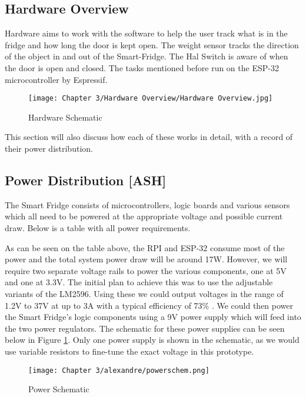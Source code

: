 \subsection{Hardware Overview}

Hardware aims to work with the software to help the user track what is in the fridge and how long the door is kept open.
The weight sensor tracks the direction of the object in and out of the Smart-Fridge.
The Hal Switch is aware of when the door is open and closed.
The tasks mentioned before run on the ESP-32 microcontroller by Espressif.


\begin{figure}[H]        
    \centering
    \texttt{[image: Chapter 3/Hardware Overview/Hardware Overview.jpg]}
    \caption{Hardware Schematic}
\end{figure} 

This section will also discuss how each of these works in detail, with a record of their power distribution.


\subsection{Power Distribution [ASH]}

The Smart Fridge consists of microcontrollers, logic boards and various sensors which all need to be powered at the appropriate voltage and possible current draw.
Below is a table with all power requirements.



As can be seen on the table above, the RPI and ESP-32 consume most of the power and the total system power draw will be around 17W.
However, we will require two separate voltage rails to power the various components, one at 5V and one at 3.3V.
The initial plan to achieve this was to use the adjustable variants of the LM2596.
Using these we could output voltages in the range of 1.2V to 37V at up to 3A with a typical efficiency of 73\% \cite{tidatasheet}.
We could then power the Smart Fridge's logic components using a 9V power supply which will feed into the two power regulators.
The schematic for these power supplies can be seen below in Figure \ref{fig:powerschem}.
Only one power supply is shown in the schematic, as we would use variable resistors to fine-tune the exact voltage in this prototype.

\begin{figure}[H]        
    \centering
    \texttt{[image: Chapter 3/alexandre/powerschem.png]}
    \caption{Power Schematic}
    \label{fig:powerschem}
\end{figure} 

